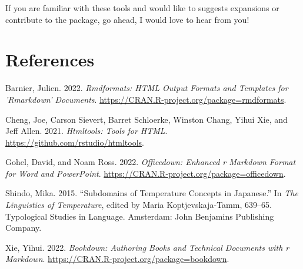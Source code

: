 \documentclass[
  letterpaper,
  DIV=11,
  numbers=noendperiod]{scrartcl}
\newlength{\cslhangindent}
\newenvironment{CSLReferences}[2] %
 {\begin{list}{}{%
  \setlength{\itemindent}{0pt}
  \setlength{\leftmargin}{0pt}
  \setlength{\parsep}{0pt}
  \ifodd #1
   \setlength{\leftmargin}{\cslhangindent}
   \setlength{\itemindent}{-1\cslhangindent}
  \fi
  \setlength{\itemsep}{#2\baselineskip}}}
 {\end{list}}
\begin{document}
If you are familiar with these tools and would like to suggests
expansions or contribute to the package, go ahead, I would love to hear
from you!

\section*{References}\label{references}

\label{refs}
\begin{CSLReferences}{1}{0}
Barnier, Julien. 2022. \emph{Rmdformats: HTML Output Formats and
Templates for 'Rmarkdown' Documents}.
\url{https://CRAN.R-project.org/package=rmdformats}.

Cheng, Joe, Carson Sievert, Barret Schloerke, Winston Chang, Yihui Xie,
and Jeff Allen. 2021. \emph{Htmltools: Tools for HTML}.
\url{https://github.com/rstudio/htmltools}.

Gohel, David, and Noam Ross. 2022. \emph{Officedown: Enhanced r Markdown
Format for Word and PowerPoint}.
\url{https://CRAN.R-project.org/package=officedown}.

Shindo, Mika. 2015. {``Subdomains of Temperature Concepts in
{Japanese}.''} In \emph{The {Linguistics} of {Temperature}}, edited by
Maria Koptjevskaja-Tamm, 639--65. Typological {Studies} in {Language}.
{Amsterdam}: {John Benjamins Publishing Company}.

Xie, Yihui. 2022. \emph{Bookdown: Authoring Books and Technical
Documents with r Markdown}.
\url{https://CRAN.R-project.org/package=bookdown}.

\end{CSLReferences}
\end{document}

